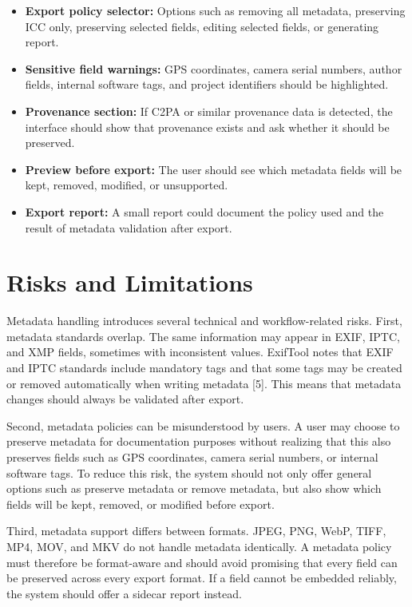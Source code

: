 \begin{itemize}[leftmargin=1.5em]
    \item \textbf{Export policy selector:} Options such as removing all metadata, preserving ICC only, preserving selected fields, editing selected fields, or generating report.
    \item \textbf{Sensitive field warnings:} GPS coordinates, camera serial numbers, author fields, internal software tags, and project identifiers should be highlighted.
    \item \textbf{Provenance section:} If C2PA or similar provenance data is detected, the interface should show that provenance exists and ask whether it should be preserved.
    \item \textbf{Preview before export:} The user should see which metadata fields will be kept, removed, modified, or unsupported.
    \item \textbf{Export report:} A small report could document the policy used and the result of metadata validation after export.
\end{itemize}

\section{Risks and Limitations}
Metadata handling introduces several technical and workflow-related risks. First, metadata standards overlap. The same information may appear in EXIF, IPTC, and XMP fields, sometimes with inconsistent values. ExifTool notes that EXIF and IPTC standards include mandatory tags and that some tags may be created or removed automatically when writing metadata [5]. This means that metadata changes should always be validated after export.

Second, metadata policies can be misunderstood by users. A user may choose to preserve metadata for documentation purposes without realizing that this also preserves fields such as GPS coordinates, camera serial numbers, or internal software tags. To reduce this risk, the system should not only offer general options such as preserve metadata or remove metadata, but also show which fields will be kept, removed, or modified before export.

Third, metadata support differs between formats. JPEG, PNG, WebP, TIFF, MP4, MOV, and MKV do not handle metadata identically. A metadata policy must therefore be format-aware and should avoid promising that every field can be preserved across every export format. If a field cannot be embedded reliably, the system should offer a sidecar report instead.

